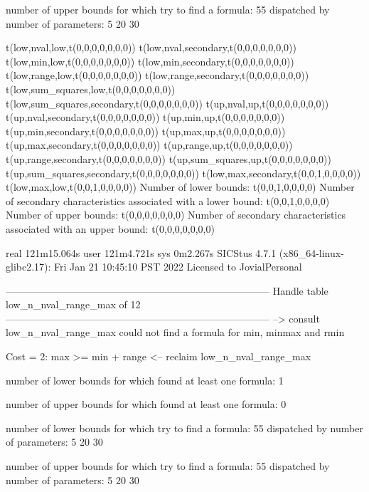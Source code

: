number of upper bounds for which try to find a formula: 55
dispatched by number of parameters: 5  20  30

t(low,nval,low,t(0,0,0,0,0,0,0))
t(low,nval,secondary,t(0,0,0,0,0,0,0))
t(low,min,low,t(0,0,0,0,0,0,0))
t(low,min,secondary,t(0,0,0,0,0,0,0))
t(low,range,low,t(0,0,0,0,0,0,0))
t(low,range,secondary,t(0,0,0,0,0,0,0))
t(low,sum_squares,low,t(0,0,0,0,0,0,0))
t(low,sum_squares,secondary,t(0,0,0,0,0,0,0))
t(up,nval,up,t(0,0,0,0,0,0,0))
t(up,nval,secondary,t(0,0,0,0,0,0,0))
t(up,min,up,t(0,0,0,0,0,0,0))
t(up,min,secondary,t(0,0,0,0,0,0,0))
t(up,max,up,t(0,0,0,0,0,0,0))
t(up,max,secondary,t(0,0,0,0,0,0,0))
t(up,range,up,t(0,0,0,0,0,0,0))
t(up,range,secondary,t(0,0,0,0,0,0,0))
t(up,sum_squares,up,t(0,0,0,0,0,0,0))
t(up,sum_squares,secondary,t(0,0,0,0,0,0,0))
t(low,max,secondary,t(0,0,1,0,0,0,0))
t(low,max,low,t(0,0,1,0,0,0,0))
Number of lower bounds:                                             t(0,0,1,0,0,0,0)
Number of secondary characteristics associated with a lower bound:  t(0,0,1,0,0,0,0)
Number of upper bounds:                                             t(0,0,0,0,0,0,0)
Number of secondary characteristics associated with an upper bound: t(0,0,0,0,0,0,0)

real	121m15.064s
user	121m4.721s
sys	0m2.267s
SICStus 4.7.1 (x86_64-linux-glibc2.17): Fri Jan 21 10:45:10 PST 2022
Licensed to JovialPersonal


--------------------------------------------------------------------------------
Handle table low_n_nval_range_max of 12
--------------------------------------------------------------------------------
--> consult low_n_nval_range_max
could not find a formula for min, minmax and rmin

Cost =  2:  max >= min + range
<-- reclaim low_n_nval_range_max

number of lower bounds for which found at least one formula: 1

number of upper bounds for which found at least one formula: 0

number of lower bounds for which try to find a formula: 55
dispatched by number of parameters: 5  20  30

number of upper bounds for which try to find a formula: 55
dispatched by number of parameters: 5  20  30

